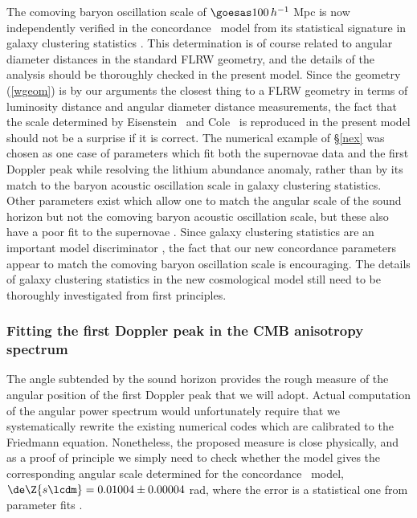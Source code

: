 \documentclass[12pt]{iopart}
\begin{document}
The comoving baryon oscillation scale of
$\goesas100\,h^{-1}$ Mpc is now independently verified in the concordance
\LCDM\ model from its statistical signature in galaxy clustering statistics
\cite{bao}. This determination is of course related to angular
diameter distances in the standard FLRW geometry, and the details of the
analysis should be thoroughly checked in the present model. Since the geometry
(\ref{wgeom}) is by our arguments the closest thing to a FLRW geometry in
terms of luminosity distance and angular diameter distance measurements,
the fact that the scale determined by Eisenstein \etal\ and Cole \etal\
is reproduced in
the present model should not be a surprise if it is
correct. The numerical example of \S\ref{nex} was chosen as one case of
parameters which fit both the supernovae data and the first Doppler peak
while resolving the lithium abundance anomaly, rather than by its match to
the baryon acoustic oscillation scale in galaxy clustering statistics.
Other parameters exist which
allow one to match the angular scale of the sound horizon but not the
comoving baryon acoustic oscillation scale, but these also have a poor
fit to the supernovae \cite{paper2}. Since galaxy clustering statistics are
an important model discriminator \cite{Blanchard}, the fact that our
new concordance parameters appear to match the comoving baryon oscillation
scale is encouraging. The details of galaxy clustering statistics in the
new cosmological model still need to be thoroughly investigated from first
principles.

\subsubsection{Fitting the first Doppler peak in the CMB anisotropy
spectrum\br}\br
The angle subtended by the sound horizon provides the rough measure of the
angular position of the first Doppler peak that we will adopt. Actual
computation of the angular power spectrum would unfortunately require
that we systematically rewrite the existing numerical codes which are
calibrated to the Friedmann equation. Nonetheless, the proposed measure
is close physically, and as a proof of principle we simply need to check
whether the model gives the corresponding angular scale determined for the
concordance \LCDM\ model, $\de\Z{s\lcdm}=0.01004\pm0.00004$ rad, where the
error is a statistical one from parameter fits \cite{wmap}.
\end{document}

